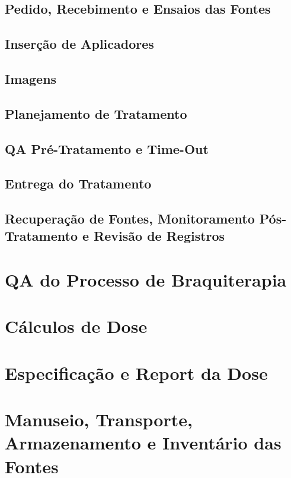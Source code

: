 \documentclass[11pt,a4paper]{article}
\begin{document}
\subsection*{Pedido, Recebimento e Ensaios das Fontes}

\subsection*{Inserção de Aplicadores}

\subsection*{Imagens}

\subsection*{Planejamento de Tratamento}

\subsection*{QA Pré-Tratamento e Time-Out}

\subsection*{Entrega do Tratamento}

\subsection*{Recuperação de Fontes, Monitoramento Pós-Tratamento e Revisão de Registros}

\section{QA do Processo de Braquiterapia}

\section{Cálculos de Dose}


\section{Especificação e Report da Dose}


\section{Manuseio, Transporte, Armazenamento e Inventário das Fontes}





\end{document}
